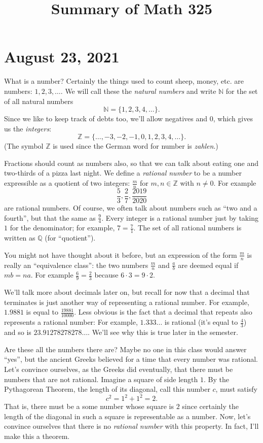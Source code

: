 \documentclass[12pt]{amsart}
\newcommand{\Q}{\mathbb{Q}}
\newcommand{\Z}{\mathbb{Z}}
\newcommand{\N}{\mathbb{N}}
\numberwithin{equation}{section}
\theoremstyle{plain} %
\newcommand{\Aug}[1]{\section{August #1, 2021}}
\theoremstyle{definition}
\theoremstyle{remark}
\begin{document}
\title{Summary of Math 325}

\tableofcontents

\Aug{23}


What is a number? Certainly the things used to count sheep, money, etc. are numbers:  $1, 2, 3, \dots$.
We will call these the {\em natural numbers} and 
write $\N$ for the set of all natural numbers
$$
\N = \{1, 2, 3, 4, \dots \}.
$$
Since we like to keep track of debts too, we'll allow negatives and $0$, which gives us the {\em integers}:
$$
\Z = \{ \dots, -3, -2, -1, 0, 1, 2, 3, 4, \dots\}.
$$
(The symbol $\Z$ is used since the German word for number is {\em zahlen}.)


Fractions should count as numbers also, so that we can talk about eating one and two-thirds of a pizza last night. We define a {\em rational number} to be a number expressible
as a quotient of two integers: $\frac{m}{n}$ for $m,n \in \Z$ with $n \ne 0$. For example
$$
\frac{5}{3}, \frac27, \frac{2019}{2020}
$$
are rational numbers. Of course, we often talk about numbers such as
``two and a fourth'', but that the same as $\frac94$. Every integer
is a rational number just by taking $1$ for the denominator; for
example, $7 = \frac{7}{1}$. 
The set of all rational numbers is written as $\Q$ (for ``quotient''). 

You might not have
thought about it before, but an expression of the form $\frac{m}{n}$ is really an ``equivalence class'': 
the two numbers $\frac{m}{n}$ and $\frac{a}{b}$ are deemed equal if $mb =
na$. For example $\frac69 = \frac23$ because $6 \cdot 3 = 9 \cdot 2$.



We'll talk more about decimals later on, but recall for now that a decimal that terminates is just another way of representing a rational number. For example,
$1.9881$ is equal to $\frac{19881}{10000}$. Less obvious is the fact that a decimal that repeats also represents a rational number: For example, 
$1.333\dots$ is rational (it's equal to $\frac43$) and so is 
$23.91278278278\dots$. We'll see why this is true later in the semester. 




Are these all the numbers there are? Maybe no one in this class  would answer ``yes'', but the ancient Greeks believed for a time that every number was rational. Let's convince
ourselves, as the Greeks did eventually, that there must be numbers that are not rational. Imagine a square of side length $1$. By the Pythagorean Theorem, the length of
its diagonal, call this number $c$, must satisfy 
$$
c^2 = 1^2 + 1^2 = 2.
$$
That is, there must be a some  number whose square is $2$ since certainly the length of the diagonal in such a square is representable as a number.  
Now, let's convince ourselves that there is no {\em rational number} with this property. In fact, I'll make this a theorem.
\end{document}
